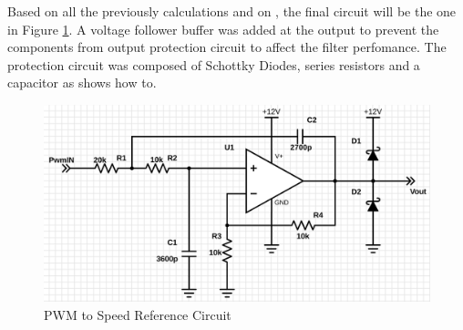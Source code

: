 		Based on all the previously calculations and on \cite{texas1999sallenkey}, the final circuit will be the one in Figure \ref{fig:pwmToSpeedReferenceCircuit}. A voltage follower buffer was added at the output to prevent the components from output protection circuit to affect the filter perfomance. The protection circuit was composed of Schottky Diodes, series resistors and a capacitor as \cite{walshAD} shows how to. 

		\begin{figure}[htbp]
			\centering
				\includegraphics[scale=0.4]{figuras/fig-pwmToSpeedReferenceCircuit}
			\caption{PWM to Speed Reference Circuit}
			\label{fig:pwmToSpeedReferenceCircuit}
		\end{figure}